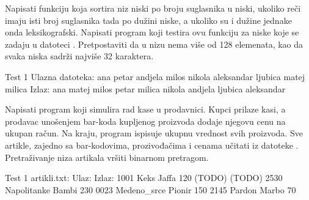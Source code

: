 \begin{Exercise}[label=511]
  Napisati funkciju koja sortira niz niski po broju suglasnika u
  niski, ukoliko reči imaju isti broj suglasnika tada po dužini niske,
  a ukoliko su i dužine jednake onda leksikografski.  Napisati program
  koji testira ovu funkciju za niske koje se zadaju u datoteci
  .  Pretpostaviti da u nizu nema više od 128
  elemenata, kao da svaka niska sadrži najviše 32 karaktera.
  
\begin{maxitest}
\begin{test}{Test 1}
Ulazna datoteka:
ana petar andjela milos nikola aleksandar ljubica matej milica
Izlaz:
ana matej milos petar milica nikola andjela ljubica aleksandar
\end{test}
\end{maxitest}
  
\end{Exercise}

\begin{Exercise}[label=512]
  Napisati program koji simulira rad kase u prodavnici. Kupci prilaze
  kasi, a prodavac unošenjem bar-koda kupljenog proizvoda dodaje
  njegovu cenu na ukupan račun. Na kraju, program ispisuje ukupnu
  vrednost svih proizvoda. Sve artikle, zajedno sa bar-kodovima,
  prozivođačima i cenama učitati iz datoteke
  . Pretraživanje niza artikala vršiti binarnom
  pretragom.
  
\begin{maxitest}
\begin{test}{Test 1}
artikli.txt:                         Ulaz:           Izlaz:
1001 Keks Jaffa 120                  (TODO)          (TODO)
2530 Napolitanke Bambi	230
0023 Medeno_srce Pionir 150
2145 Pardon Marbo 70
\end{test}
\end{maxitest}
  
\end{Exercise}

